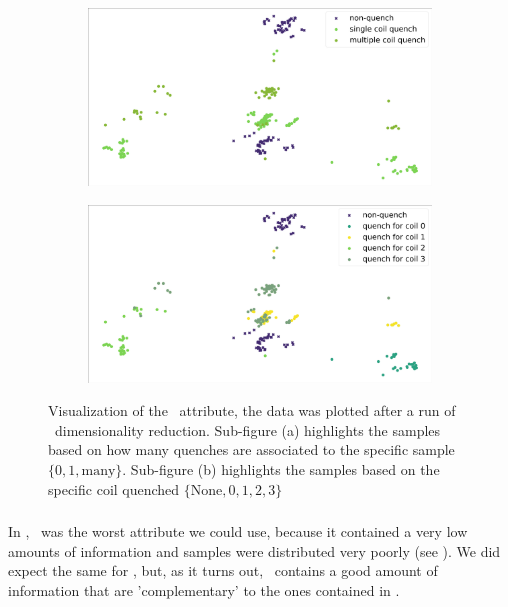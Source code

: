 \begin{figure}[!ht]
	\centering
	\begin{subfigure}{0.8\linewidth}
		\centering
		\includegraphics[width=\linewidth]{img/quench_dist_qlp/single_vs_multiple_An.png}
		\subcaption{}
	\end{subfigure}
	\begin{subfigure}{0.8\linewidth}
		\centering
		\includegraphics[width=\linewidth]{img/quench_dist_qlp_an.png}
		\subcaption{}
	\end{subfigure}
	\caption{Visualization of the \an\ attribute, the data was plotted after a run of \pca\
		dimensionality reduction. Sub-figure (a) highlights the samples based on how many quenches
		are associated to the specific sample $\{0, 1, \text{many}\}$. Sub-figure (b) highlights the
		samples based on the specific coil quenched $\{\text{None}, 0, 1, 2, 3\}$}\label{fig:an-coilq-dist}
\end{figure}

\subsubsection{\bn}
In \qrp, \bn\ was the worst attribute we could use, because it contained a very low amounts of
information and samples were distributed very poorly (see \Cref{fig:bn-dist}). We did expect the
same for \qlp, but, as it turns out, \bn\ contains a good amount of information that are
'complementary' to the ones contained in \an.

